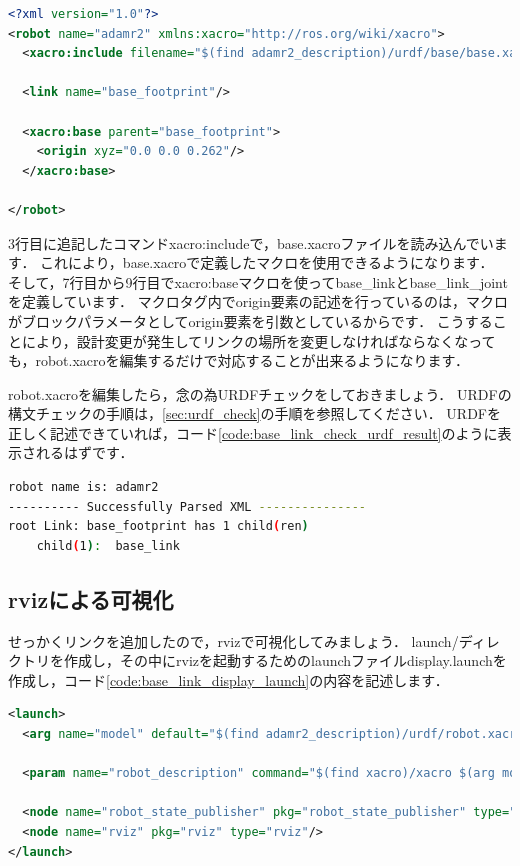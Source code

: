 \documentclass[{../../master}]{subfiles}
\begin{document}
\begin{lstlisting}[language=XML, label=code:robot_xacro_add_base_link, caption=Add \textsf{base\_link} to Robot Model]
<?xml version="1.0"?>
<robot name="adamr2" xmlns:xacro="http://ros.org/wiki/xacro">
  <xacro:include filename="$(find adamr2_description)/urdf/base/base.xacro"/>

  <link name="base_footprint"/>

  <xacro:base parent="base_footprint">
    <origin xyz="0.0 0.0 0.262"/>
  </xacro:base>

</robot>
\end{lstlisting}

3行目に追記したコマンド\textsf{xacro:include}で，\textsf{base.xacro}ファイルを読み込んでいます．
これにより，\textsf{base.xacro}で定義したマクロを使用できるようになります．
そして，7行目から9行目で\textsf{xacro:base}マクロを使って\textsf{base\_link}と\textsf{base\_link\_joint}を定義しています．
マクロタグ内で\textsf{origin}要素の記述を行っているのは，マクロがブロックパラメータとして\textsf{origin}要素を引数としているからです．
こうすることにより，設計変更が発生してリンクの場所を変更しなければならなくなっても，\textsf{robot.xacro}を編集するだけで対応することが出来るようになります．

\textsf{robot.xacro}を編集したら，念の為URDFチェックをしておきましょう．
URDFの構文チェックの手順は，\ref{sec:urdf_check}の手順を参照してください．
URDFを正しく記述できていれば，コード\ref{code:base_link_check_urdf_result}のように表示されるはずです．

\begin{lstlisting}[language=sh, label=code:base_link_check_urdf_result, caption=Result of Check URDF]
robot name is: adamr2
---------- Successfully Parsed XML ---------------
root Link: base_footprint has 1 child(ren)
    child(1):  base_link  
\end{lstlisting}

\subsection{\textsf{rviz}による可視化}

せっかくリンクを追加したので，\textsf{rviz}で可視化してみましょう．
\textsf{launch/}ディレクトリを作成し，その中に\textsf{rviz}を起動するためのlaunchファイル\textsf{display.launch}を作成し，コード\ref{code:base_link_display_launch}の内容を記述します．

\begin{lstlisting}[language=XML, label=code:base_link_display_launch, caption=\textsf{display.launch}]
<launch>
  <arg name="model" default="$(find adamr2_description)/urdf/robot.xacro"/>

  <param name="robot_description" command="$(find xacro)/xacro $(arg model)"/>

  <node name="robot_state_publisher" pkg="robot_state_publisher" type="robot_state_publisher"/>
  <node name="rviz" pkg="rviz" type="rviz"/>
</launch>
\end{lstlisting}
\end{document}
